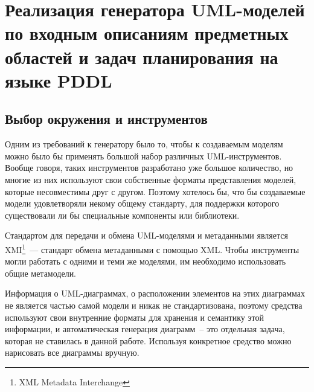 \chapter{Реализация генератора UML-моделей по входным описаниям предметных областей и задач планирования на языке PDDL}

\section{Выбор окружения и инструментов}

Одним из требований к генератору было то, чтобы к создаваемым моделям можно было бы применять большой набор различных UML-инструментов. Вообще говоря, таких инструментов разработано уже большое количество, но многие из них используют свои собственные форматы представления моделей, которые несовместимы друг с другом. Поэтому хотелось бы, что бы создаваемые модели удовлетворяли некому общему стандарту, для поддержки которого существовали ли бы специальные компоненты или библиотеки. 


Стандартом для передачи и обмена UML-моделями и метаданными является XMI\footnote{XML Metadata Interchange}~--- стандарт обмена метаданными с помощью XML. Чтобы инструменты могли работать с одними и теми же моделями, им необходимо использовать общие метамодели. 

Информация о UML-диаграммах, о расположении элементов на этих диаграммах не является частью самой модели и никак не стандартизована, поэтому средства используют свои внутренние форматы для хранения и семантику этой информации, и автоматическая генерация диаграмм~-- это отдельная задача, которая не ставилась в данной работе. Используя конкретное средство можно нарисовать все диаграммы вручную. 

